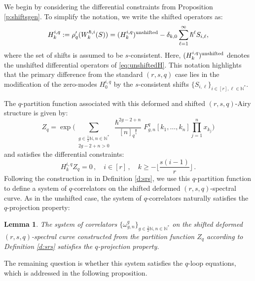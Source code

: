 \documentclass[reqno,11pt]{amsart}
\theoremstyle{plain}
\newtheorem{lemma}[theorem]{Lemma}
\theoremstyle{definition}
\theoremstyle{remark}
\numberwithin{equation}{section}
\newcommand{\mb}[1]{\mathbb{#1}}
\newcommand{\1}{\mathds{1}}
\newcommand{\N}{\mb{N}}
\newcommand{\2}{\frac{1}{2}}
\begin{document}
{								We begin by considering the differential constraints from Proposition \ref{p:shiftsgen}. To simplify the notation, we write the shifted operators as:
								\begin{equation}
									H^{i,q}_k :=  \rho_q'(W^{\hslash,i}_k(S)) =(H^{i,q}_k)^{\textup{unshifted}} -\delta_{k,0} \sum_{\ell=1}^\infty \hslash^\ell S_{i,\ell},
								\end{equation}
								where  the set of shifts is assumed to be $s$-consistent. Here, $(H^{i,q}_k)^{\textup{unshifted}}$  denotes the  unshifted differential operators of \eqref{eq:unshiftedH}.
								This notation highlights that the primary difference from the standard $(r,s,q)$ case lies in the modification of the zero-modes $H^{i,q}_0$ by the $s$-consistent shifts $\{S_{i,\ell} \}_{i \in [r], \ell \in \mathbb{N}^*}$.
								
								The $q$-partition function associated  with this deformed and shifted $(r,s,q)$-Airy structure is given by:
								\begin{equation}
									Z_q = \exp \bigg( \sum_{ \substack{g \in \frac{1}{2} \N, n \in \N^* \\ 2g-2+n > 0}} \frac{\hslash^{2g-2+n}}{[n]_q!} F^{q}_{g,n}[k_1, \dotsc, k_n] \prod_{j=1}^n x_{k_j} \bigg)
								\end{equation}
								and satisfies the differential constraints:
								\begin{equation}
									H^{i,q}_k Z_q = 0 \,, \quad i \in [r]\,, \quad k \geq - \lfloor \frac{s(i-1)}{r} \rfloor\, .
								\end{equation}
								Following the construction in in Definition \ref{d:srs}, we use this  $q$-partition function to define  a system of $q$-correlators on the shifted deformed $(r,s,q)$-spectral curve. As in the unshifted case, the system of $q$-correlators naturally satisfies the $q$-projection property: 
								\begin{lemma}\label{l:projpropshift}
									The system of correlators $\{\omega^{q}_{g,n} \}_{g \in \frac{1}{2}\mathbb{N}, n \in \mathbb{N}^*}$ on the shifted deformed $(r,s,q)$-spectral curve constructed from the partition function $Z_q$ according to Definition \ref{d:srs} satisfies the $q$-projection property.
								\end{lemma}
								The remaining question is whether this system satisfies the $q$-loop equations, which is addressed in the following proposition.
								
}
\end{document}
